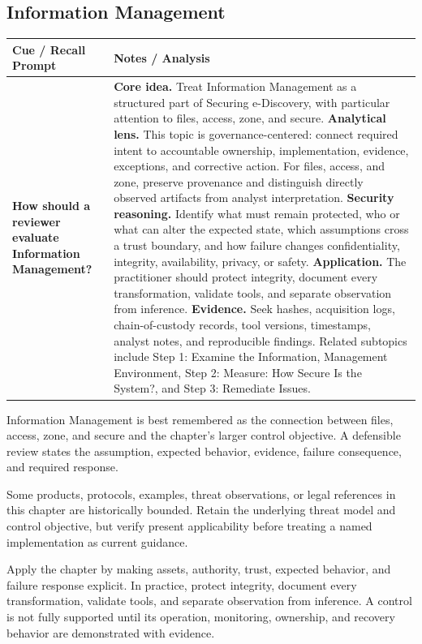 \documentclass[11pt]{article}
\newcommand{\CornellHeader}{%
\rowcolor{Navy}\color{white}\bfseries Cue / Recall Prompt & \color{white}\bfseries Notes / Analysis\\\hline}
\newcommand{\CornellRow}[2]{%
\cellcolor{CueGray}\RaggedRight\textbf{#1} & \RaggedRight #2\\\hline}
\begin{document}
\subsection*{Information Management}
\begin{longtable}{>{\RaggedRight\arraybackslash}p{}|>{\RaggedRight\arraybackslash}p{}}
\CornellHeader
\CornellRow{How should a reviewer evaluate Information Management?}{\textbf{Core idea.} Treat Information Management as a structured part of Securing e-Discovery, with particular attention to files, access, zone, and secure. \textbf{Analytical lens.} This topic is governance-centered: connect required intent to accountable ownership, implementation, evidence, exceptions, and corrective action. For files, access, and zone, preserve provenance and distinguish directly observed artifacts from analyst interpretation. \textbf{Security reasoning.} Identify what must remain protected, who or what can alter the expected state, which assumptions cross a trust boundary, and how failure changes confidentiality, integrity, availability, privacy, or safety. \textbf{Application.} The practitioner should protect integrity, document every transformation, validate tools, and separate observation from inference. \textbf{Evidence.} Seek hashes, acquisition logs, chain-of-custody records, tool versions, timestamps, analyst notes, and reproducible findings. Related subtopics include Step 1: Examine the Information, Management Environment, Step 2: Measure: How Secure Is the System?, and Step 3: Remediate Issues.}
\end{longtable}
\begin{topicsummary}
Information Management is best remembered as the connection between files, access, zone, and secure and the chapter's larger control objective. A defensible review states the assumption, expected behavior, evidence, failure consequence, and required response.
\end{topicsummary}
\begin{historybox}
Some products, protocols, examples, threat observations, or legal references in this chapter are historically bounded. Retain the underlying threat model and control objective, but verify present applicability before treating a named implementation as current guidance.
\end{historybox}
\begin{defensebox}
Apply the chapter by making assets, authority, trust, expected behavior, and failure response explicit. In practice, protect integrity, document every transformation, validate tools, and separate observation from inference. A control is not fully supported until its operation, monitoring, ownership, and recovery behavior are demonstrated with evidence.
\end{defensebox}
\end{document}
